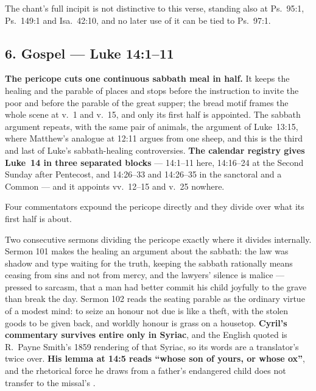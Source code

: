 The chant's full incipit is not distinctive to this verse, standing also at
Ps.~95:1, Ps.~149:1 and Isa.~42:10, and no later use of it can be tied to
Ps.~97:1.

\subsection*{6. Gospel  --- Luke 14:1--11}

\textbf{The pericope cuts one continuous sabbath meal in half.} It keeps the
healing and the parable of places and stops before the instruction to invite the
poor and before the parable of the great supper; the bread motif frames the
whole scene at v.~1 and v.~15, and only its first half is appointed. The sabbath
argument repeats, with the same pair of animals, the argument of Luke~13:15,
where Matthew's analogue at 12:11 argues from one sheep, and this is the third
and last of Luke's sabbath-healing controversies. \textbf{The calendar registry
gives Luke~14 in three separated blocks} --- 14:1--11 here, 14:16--24 at the
Second Sunday after Pentecost, and 14:26--33 and 14:26--35 in the sanctoral and
a Common --- and it appoints vv.~12--15 and v.~25 nowhere.

Four commentators expound the pericope directly and they divide over what its
first half is about.

\begin{witnessnote}
Two consecutive sermons dividing the pericope exactly where it divides
internally. Sermon 101 makes the healing an argument about the sabbath: the law
was shadow and type waiting for the truth, keeping the sabbath rationally means
ceasing from sins and not from mercy, and the lawyers' silence is malice ---
pressed to sarcasm, that a man had better commit his child joyfully to the grave
than break the day. Sermon 102 reads the seating parable as the ordinary virtue
of a modest mind: to seize an honour not due is like a theft, with the stolen
goods to be given back, and worldly honour is grass on a housetop.
\textbf{Cyril's commentary survives entire only in Syriac}, and the English quoted
is R.~Payne Smith's 1859 rendering of that Syriac, so its words
are a translator's twice over. \textbf{His lemma at 14:5 reads ``whose son of
yours, or whose ox''}, and the rhetorical force he draws from a father's
endangered child does not transfer to the missal's .
\end{witnessnote}

